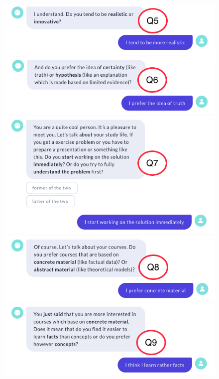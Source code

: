 \begin{figure}[H]
  \centering
  \includegraphics[width=0.7\linewidth]{images/Talk_roterMarker/T5.png}
  \includegraphics[width=0.7\linewidth]{images/Talk_roterMarker/T6.png}
  \includegraphics[width=0.7\linewidth]{images/Talk_roterMarker/T7.png}
  \includegraphics[width=0.7\linewidth]{images/Talk_roterMarker/T8.png}
  \includegraphics[width=0.7\linewidth]{images/Talk_roterMarker/T9.png}
  \label{fig:GesprächII}
\end{figure} 
